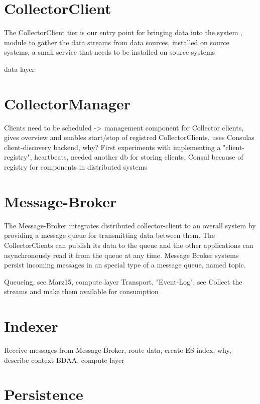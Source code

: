 \section{CollectorClient}

The CollectorClient tier is our entry point for bringing data into the system , module to gather the data streams
from data sources, installed on source systems, a small service that needs to be installed on source systems

data layer

\section{CollectorManager}

Clients need to be scheduled -> management component for Collector clients, gives overview and enables start/stop of
registred CollectorClients, uses Consulas client-discovery backend, why? First experiments with implementing a "client-registry",
heartbeats, needed another db for storing clients, Consul because of registry for components in distributed systems

%
\section{Message-Broker}

The Message-Broker integrates distributed collector-client to an overall system by providing a
message queue for transmitting data between them. The CollectorClients can publish
its data to the queue and the other applications can asynchronously read it from the queue at any time.
Message Broker systems persist incoming messages in an special type of a message queue, named topic.

Queueing, see Marz15, compute layer
Transport, "Event-Log", see \cite{Kreps13}
Collect the streams and make them available for consumption

\section{Indexer}

Receive messages from Message-Broker, route data, create ES index, why, describe context BDAA, compute layer

\section{Persistence}

